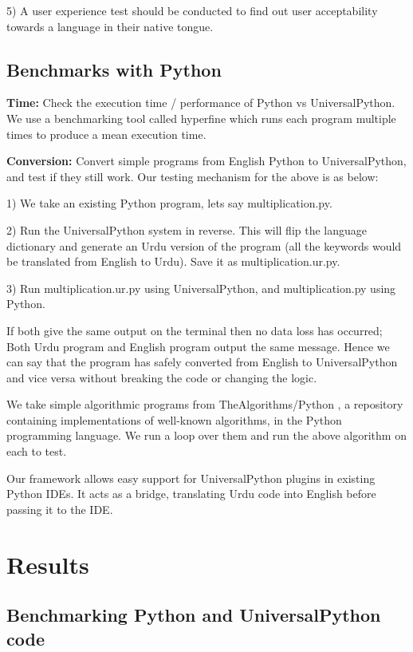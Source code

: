 \documentclass[conference]{IEEEtran}
\begin{document}
5) A user experience test should be conducted to find out user acceptability towards a language in their native tongue.

\subsection{Benchmarks with Python}\label{BB}

\textbf{Time:} Check the execution time / performance of Python vs UniversalPython. We use a benchmarking tool called hyperfine which runs each program multiple times to produce a mean execution time.

\textbf{Conversion:} Convert simple programs from English Python to UniversalPython, and test if they still work. Our testing mechanism for the above is as below:

1) We take an existing Python program, lets say multiplication.py.

2) Run the UniversalPython system in reverse. This will flip the language dictionary and generate an Urdu version of the program (all the keywords would be translated from English to Urdu). Save it as multiplication.ur.py.

3) Run multiplication.ur.py using UniversalPython, and multiplication.py using Python.

If both give the same output on the terminal then no data loss has occurred; Both Urdu program and English program output the same message. Hence we can say that the program has safely converted from English to UniversalPython and vice versa without breaking the code or changing the logic.

We take simple algorithmic programs from TheAlgorithms/Python \cite{thealgorithms_python}, a repository containing implementations of well-known algorithms, in the Python programming language. We run a loop over them and run the above algorithm on each to test.

Our framework allows easy support for UniversalPython plugins in existing Python IDEs. It acts as a bridge, translating Urdu code into English before passing it to the IDE.


\section{Results}


\subsection{Benchmarking Python and UniversalPython code}
\end{document}
